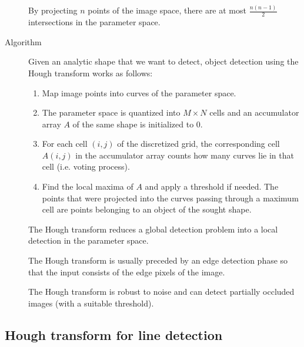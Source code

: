 \begin{description}
\begin{example}
            \begin{remark}
                By projecting $n$ points of the image space, there are at most $\frac{n(n-1)}{2}$ intersections in the parameter space.
            \end{remark}
        \end{example}

    \item[Algorithm] 
        Given an analytic shape that we want to detect, 
        object detection using the Hough transform works as follows:
        \begin{enumerate}
            \item Map image points into curves of the parameter space.
            \item The parameter space is quantized into $M \times N$ cells and an accumulator array $A$ of the same shape is initialized to $0$.
            \item For each cell $(i, j)$ of the discretized grid, 
                the corresponding cell $A(i, j)$ in the accumulator array counts how many curves lie in that cell (i.e. voting process).
            \item Find the local maxima of $A$ and apply a threshold if needed.
                The points that were projected into the curves passing through a maximum cell are points belonging to an object of the sought shape.
        \end{enumerate}
        
        \begin{remark}
            The Hough transform reduces a global detection problem into a local detection in the parameter space.
        \end{remark}

        \begin{remark}
            The Hough transform is usually preceded by an edge detection phase so that the input consists of the edge pixels of the image.
        \end{remark}

        \begin{remark}
            The Hough transform is robust to noise and can detect partially occluded images (with a suitable threshold).
        \end{remark}
\end{description}


\subsection{Hough transform for line detection}

